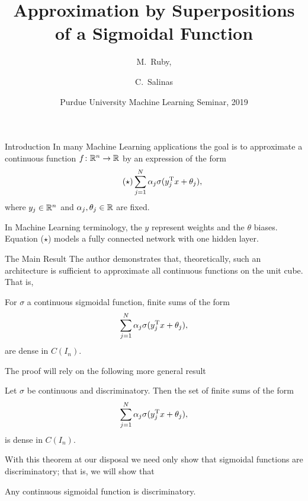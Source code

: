 \documentclass[11pt,letterpaper]{beamer}
\title[Approximation by a Sigmoidal Function] 
{Approximation by Superpositions of a Sigmoidal Function}
\author[M.\ Ruby, C.\ Salinas] 
{M.\ Ruby,%
  \and C.\ Salinas%
}
\institute[Purdue University] %
{
  Department of Mathematics\\
  Purdue University
 }
\date[Spring 2019] %
{Purdue University Machine Learning Seminar, 2019}
\begin{document}
\frame{\titlepage}

\begin{frame}{Introduction}
  In many Machine Learning applications the goal is to approximate a continuous
  function $f\colon\mathbb{R}^n\to\mathbb{R}$ by an expression of the form
  \begin{equation*}
    \tag{$\star$}
    \sum_{j=1}^N \alpha_j\sigma( y_j^{\mathrm{T}} x+\theta_j),
  \end{equation*}
  where $ y_j\in\mathbb{R}^n$ and $\alpha_j,\theta_j\in\mathbb{R}$ are fixed.

  In Machine Learning terminology, the $ y$ represent weights and the $\theta$
  biases. Equation ($\star$) models a fully connected network with one hidden
  layer.
\end{frame}

\begin{frame}{The Main Result}
  The author demonstrates that, theoretically, such an architecture is
  sufficient to approximate all continuous functions on the unit cube. That is,
  \begin{theorem}
    For $\sigma$ a continuous sigmoidal function, finite sums of the form
    \[
      \sum_{j=1}^N \alpha_j\sigma( y_j^{\mathrm{T}} x+\theta_j),
    \]
    are dense in $C(I_n)$.
  \end{theorem}
\end{frame}

\begin{frame}
  The proof will rely on the following more general result
  \begin{theorem}
    Let $\sigma$ be continuous and discriminatory. Then the set of finite sums
    of the form
    \[
      \sum_{j=1}^N \alpha_j\sigma( y_j^{\mathrm{T}} x+\theta_j),
    \]
    is dense in $C(I_n)$.
  \end{theorem}
  With this theorem at our disposal we need only show that sigmoidal functions
  are discriminatory; that is, we will show that
    \begin{lemma}
      Any continuous sigmoidal function is discriminatory.
  \end{lemma}
\end{frame}
\end{document}
